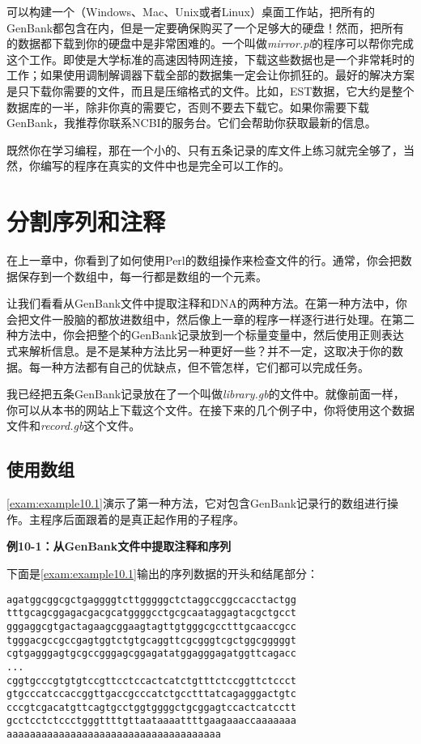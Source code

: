 可以构建一个（Windows、Mac、Unix或者Linux）桌面工作站，把所有的GenBank都包含在内，但是一定要确保购买了一个足够大的硬盘！然而，把所有的数据都下载到你的硬盘中是非常困难的。一个叫做\textit{mirror.pl}的程序可以帮你完成这个工作。即使是大学标准的高速因特网连接，下载这些数据也是一个非常耗时的工作；如果使用调制解调器下载全部的数据集一定会让你抓狂的。最好的解决方案是只下载你需要的文件，而且是压缩格式的文件。比如，EST数据，它大约是整个数据库的一半，除非你真的需要它，否则不要去下载它。如果你需要下载GenBank，我推荐你联系NCBI的服务台。它们会帮助你获取最新的信息。

既然你在学习编程，那在一个小的、只有五条记录的库文件上练习就完全够了，当然，你编写的程序在真实的文件中也是完全可以工作的。

\section{分割序列和注释}
在上一章中，你看到了如何使用Perl的数组操作来检查文件的行。通常，你会把数据保存到一个数组中，每一行都是数组的一个元素。

让我们看看从GenBank文件中提取注释和DNA的两种方法。在第一种方法中，你会把文件一股脑的都放进数组中，然后像上一章的程序一样逐行进行处理。在第二种方法中，你会把整个的GenBank记录放到一个标量变量中，然后使用正则表达式来解析信息。是不是某种方法比另一种更好一些？并不一定，这取决于你的数据。每一种方法都有自己的优缺点，但不管怎样，它们都可以完成任务。

我已经把五条GenBank记录放在了一个叫做\textit{library.gb}的文件中。就像前面一样，你可以从本书的网站上下载这个文件。在接下来的几个例子中，你将使用这个数据文件和\textit{record.gb}这个文件。

\subsection{使用数组}
\autoref{exam:example10.1}演示了第一种方法，它对包含GenBank记录行的数组进行操作。主程序后面跟着的是真正起作用的子程序。

\textbf{例10-1：从GenBank文件中提取注释和序列}


下面是\autoref{exam:example10.1}输出的序列数据的开头和结尾部分：

\begin{lstlisting}
agatggcggcgctgaggggtcttgggggctctaggccggccacctactgg
tttgcagcggagacgacgcatggggcctgcgcaataggagtacgctgcct
gggaggcgtgactagaagcggaagtagttgtgggcgcctttgcaaccgcc
tgggacgccgccgagtggtctgtgcaggttcgcgggtcgctggcgggggt
cgtgagggagtgcgccgggagcggagatatggagggagatggttcagacc
...
cggtgcccgtgtgtccgttcctccactcatctgtttctccggttctccct
gtgcccatccaccggttgaccgcccatctgcctttatcagagggactgtc
cccgtcgacatgttcagtgcctggtggggctgcggagtccactcatcctt
gcctcctctccctgggttttgttaataaaattttgaagaaaccaaaaaaa
aaaaaaaaaaaaaaaaaaaaaaaaaaaaaaaaaaaaa
\end{lstlisting}

